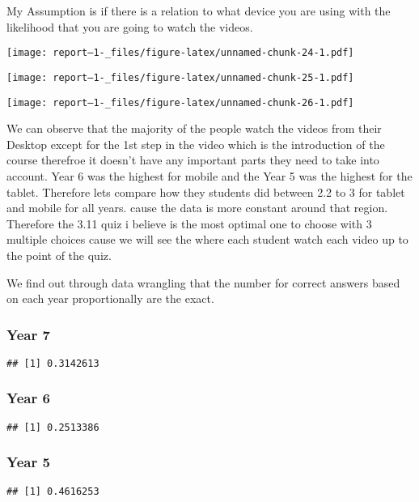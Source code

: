 \documentclass[
]{article}
\begin{document}
My Assumption is if there is a relation to what device you are using
with the likelihood that you are going to watch the videos.

\texttt{[image: report--1-\_files/figure-latex/unnamed-chunk-24-1.pdf]}

\texttt{[image: report--1-\_files/figure-latex/unnamed-chunk-25-1.pdf]}

\texttt{[image: report--1-\_files/figure-latex/unnamed-chunk-26-1.pdf]}

We can observe that the majority of the people watch the videos from
their Desktop except for the 1st step in the video which is the
introduction of the course therefroe it doesn't have any important parts
they need to take into account. Year 6 was the highest for mobile and
the Year 5 was the highest for the tablet. Therefore lets compare how
they students did between 2.2 to 3 for tablet and mobile for all years.
cause the data is more constant around that region. Therefore the 3.11
quiz i believe is the most optimal one to choose with 3 multiple choices
cause we will see the where each student watch each video up to the
point of the quiz.

We find out through data wrangling that the number for correct answers
based on each year proportionally are the exact.

\hypertarget{year-7-5}{%
\subsubsection{Year 7}\label{year-7-5}}

\begin{verbatim}
## [1] 0.3142613
\end{verbatim}

\hypertarget{year-6-5}{%
\subsubsection{Year 6}\label{year-6-5}}

\begin{verbatim}
## [1] 0.2513386
\end{verbatim}

\hypertarget{year-5-5}{%
\subsubsection{Year 5}\label{year-5-5}}

\begin{verbatim}
## [1] 0.4616253
\end{verbatim}
\end{document}
